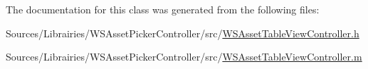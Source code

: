 The documentation for this class was generated from the following files\-:\begin{DoxyCompactItemize}
\item 
Sources/\-Librairies/\-W\-S\-Asset\-Picker\-Controller/src/\hyperlink{_w_s_asset_table_view_controller_8h}{W\-S\-Asset\-Table\-View\-Controller.\-h}\item 
Sources/\-Librairies/\-W\-S\-Asset\-Picker\-Controller/src/\hyperlink{_w_s_asset_table_view_controller_8m}{W\-S\-Asset\-Table\-View\-Controller.\-m}\end{DoxyCompactItemize}
